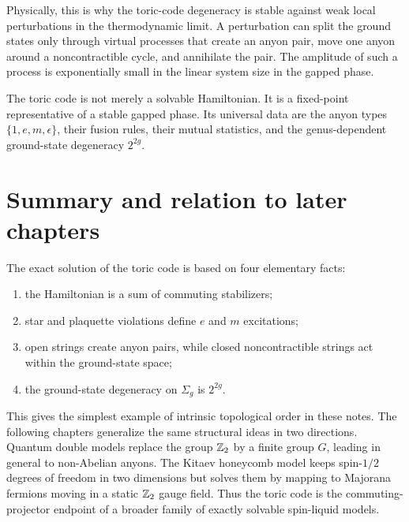 Physically, this is why the toric-code degeneracy is stable against weak local
perturbations in the thermodynamic limit.  A perturbation can split the ground
states only through virtual processes that create an anyon pair, move one anyon
around a noncontractible cycle, and annihilate the pair.  The amplitude of such a
process is exponentially small in the linear system size in the gapped phase.

\begin{principle}
The toric code is not merely a solvable Hamiltonian.  It is a fixed-point
representative of a stable gapped phase.  Its universal data are the anyon types
\(\{1,e,m,\epsilon\}\), their fusion rules, their mutual statistics, and the
genus-dependent ground-state degeneracy \(2^{2g}\).
\end{principle}

\section{Summary and relation to later chapters}
\label{sec:toric-code-summary}

The exact solution of the toric code is based on four elementary facts:
\begin{enumerate}[label=(\roman*)]
    \item the Hamiltonian is a sum of commuting stabilizers;
    \item star and plaquette violations define \(e\) and \(m\) excitations;
    \item open strings create anyon pairs, while closed noncontractible strings
    act within the ground-state space;
    \item the ground-state degeneracy on \(\Sigma_g\) is \(2^{2g}\).
\end{enumerate}
This gives the simplest example of intrinsic topological order in these notes.
The following chapters generalize the same structural ideas in two directions.
Quantum double models replace the group \(\mathbb{Z}_2\) by a finite group \(G\), leading
in general to non-Abelian anyons.  The Kitaev honeycomb model keeps spin-\(1/2\)
degrees of freedom in two dimensions but solves them by mapping to Majorana
fermions moving in a static \(\mathbb{Z}_2\) gauge field.  Thus the toric code is the
commuting-projector endpoint of a broader family of exactly solvable
spin-liquid models.
